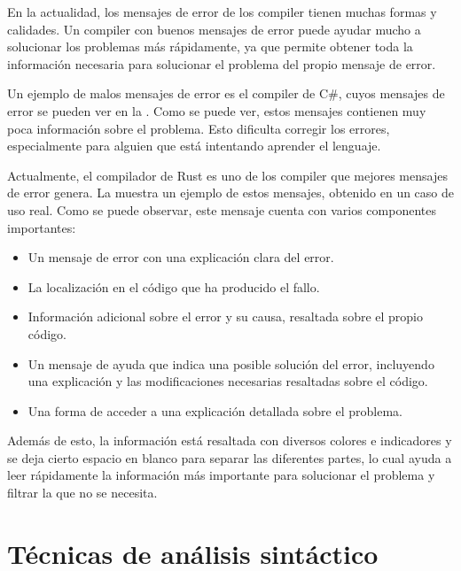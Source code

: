 En la actualidad, los mensajes de error de los \gls{compiler} tienen muchas
formas y calidades. Un \gls{compiler} con buenos mensajes de error puede ayudar
mucho a solucionar los problemas más rápidamente, ya que permite obtener toda la
información necesaria para solucionar el problema del propio mensaje de error.

Un ejemplo de malos mensajes de error es el \gls{compiler} de C\#, cuyos mensajes
de error se pueden ver en la . Como se puede ver, estos
mensajes contienen muy poca información sobre el problema. Esto dificulta
corregir los errores, especialmente para alguien que está intentando aprender el
lenguaje.


Actualmente, el compilador de Rust \parencite{Rust} es uno de los
compiler que mejores mensajes de error genera. La 
muestra un ejemplo de estos mensajes, obtenido en un caso de uso real. Como se
puede observar, este mensaje cuenta con varios componentes importantes:

\begin{itemize}
    \item Un mensaje de error con una explicación clara del error.
    \item La localización en el código que ha producido el fallo.
    \item Información adicional sobre el error y su causa, resaltada sobre el
    propio código.
    \item Un mensaje de ayuda que indica una posible solución del error,
    incluyendo una explicación y las modificaciones necesarias resaltadas sobre
    el código.
    \item Una forma de acceder a una explicación detallada sobre el problema.
\end{itemize}

Además de esto, la información está resaltada con diversos colores e indicadores
y se deja cierto espacio en blanco para separar las diferentes partes, lo cual
ayuda a leer rápidamente la información más importante para solucionar el
problema y filtrar la que no se necesita.


\FloatBarrier

\section{Técnicas de análisis sintáctico}\label{sec:parser-techniques}

